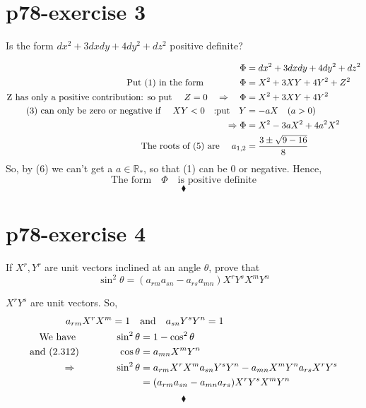 \section{p78-exercise 3}
\begin{tcolorbox}
Is the form $dx^2+3dxdy+4dy^2+dz^2$ positive definite?
\end{tcolorbox}
\begin{align}
\Phi &= dx^2+3dxdy+4dy^2+dz^2\\
\text{Put (1) in the form}\quad\quad\quad\quad  \Phi &= X^2+3XY+4Y^2+Z^2\\
\text{Z has only a positive contribution: so put }\quad Z=0\quad\Rightarrow \quad \Phi &= X^2+3XY+4Y^2\\
\text{(3) can only be zero or negative if }\quad XY < 0\quad\text{:put}\quad Y & =-aX\quad (a>0)\\
\Rightarrow \Phi &= X^2-3aX^2 +4a^2X^2\\
\text{The roots of (5) are }\quad a_{1,2} &= \frac{3\pm \sqrt{9-16}}{8}
\end{align}
So, by (6) we can't get a $a \in \mathbb{R}_*$, so that (1) can be $0$ or negative. Hence,
$$\text{The form}\quad \Phi \quad \text{is positive definite}$$
$$\blacklozenge$$
\newpage

\section{p78-exercise 4}
\begin{tcolorbox}
If $X^r, Y^r$ are unit vectors inclined at an angle $\theta$, prove that $$\sin^2 \theta = (a_{rm}a_{sn}- a_{rs}a_{mn})X^r Y^s X^m Y^n$$
\end{tcolorbox}
$X^r Y^s$ are unit vectors. So,
\begin{align*}
\ a_{rm}X^rX^m = 1 \quad &\text{and}\quad a_{sn}Y^sY^n = 1\\
\text{We have}\quad\quad\quad\quad \sin^2\theta &= 1 - \cos^2\theta\\
\text{and (2.312)}\quad\quad\quad\quad \cos\theta &= a_{mn}X^mY^n\\
\Rightarrow\quad\quad\quad\quad \sin^2 \theta &= a_{rm}X^rX^m a_{sn}Y^sY^n - a_{mn}X^mY^na_{rs}X^rY^s\\
\ &= (a_{rm} a_{sn} - a_{mn}a_{rs})X^rY^sX^mY^n
\end{align*}
$$\blacklozenge$$
\newpage

